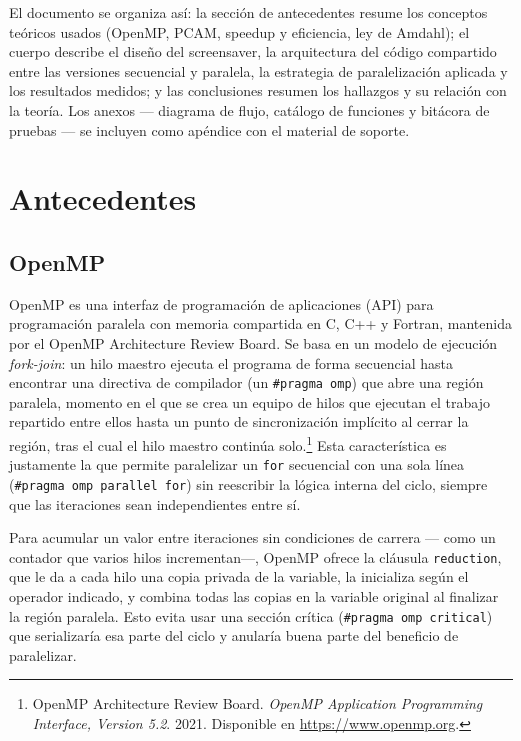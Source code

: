 \documentclass[12pt,letterpaper]{article}
\begin{document}
El documento se organiza así: la sección de antecedentes resume los
conceptos teóricos usados (OpenMP, PCAM, speedup y eficiencia, ley de
Amdahl); el cuerpo describe el diseño del screensaver, la arquitectura
del código compartido entre las versiones secuencial y paralela, la
estrategia de paralelización aplicada y los resultados medidos; y las
conclusiones resumen los hallazgos y su relación con la teoría. Los
anexos --- diagrama de flujo, catálogo de funciones y bitácora de
pruebas --- se incluyen como apéndice con el material de soporte.

\section{Antecedentes}

\subsection{OpenMP}

OpenMP es una interfaz de programación de aplicaciones (API) para
programación paralela con memoria compartida en C, C++ y Fortran,
mantenida por el OpenMP Architecture Review Board. Se basa en un modelo
de ejecución \emph{fork-join}: un hilo maestro ejecuta el programa de
forma secuencial hasta encontrar una directiva de compilador (un
\texttt{\#pragma omp}) que abre una región paralela, momento en el que se
crea un equipo de hilos que ejecutan el trabajo repartido entre ellos
hasta un punto de sincronización implícito al cerrar la región, tras el
cual el hilo maestro continúa solo.\footnote{OpenMP Architecture Review
Board. \emph{OpenMP Application Programming Interface, Version 5.2}.
2021. Disponible en \url{https://www.openmp.org}.} Esta característica es
justamente la que permite paralelizar un \texttt{for} secuencial con una
sola línea (\texttt{\#pragma omp parallel for}) sin reescribir la lógica
interna del ciclo, siempre que las iteraciones sean independientes entre
sí.

Para acumular un valor entre iteraciones sin condiciones de carrera ---
como un contador que varios hilos incrementan---, OpenMP ofrece la
cláusula \texttt{reduction}, que le da a cada hilo una copia privada de
la variable, la inicializa según el operador indicado, y combina todas
las copias en la variable original al finalizar la región paralela. Esto
evita usar una sección crítica (\texttt{\#pragma omp critical}) que
serializaría esa parte del ciclo y anularía buena parte del beneficio de
paralelizar.
\end{document}
